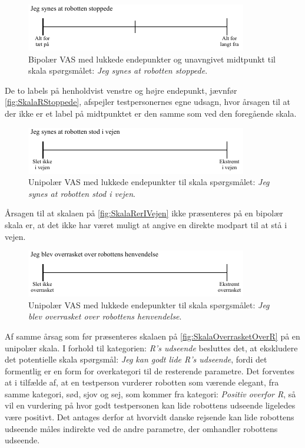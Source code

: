 %
\begin{figure}[H]
\centering
\includegraphics[width =\textwidth]{Figure/UdvalgteSkalaer/RStoppede} 
\caption{Bipolær VAS med lukkede endepunkter og unavngivet midtpunkt til skala spørgsmålet: \textit{Jeg synes at robotten stoppede}.}
\label{fig:SkalaRStoppede}
\end{figure}
\noindent
%
De to labels på henholdvist venstre og højre endepunkt, jævnfør \autoref{fig:SkalaRStoppede}, afspejler testpersonernes egne udsagn, hvor årsagen til at der ikke er et label på midtpunktet er den samme som ved den foregående skala. 
%
\begin{figure}[H]
\centering
\includegraphics[width =\textwidth]{Figure/UdvalgteSkalaer/RobottenErIVejen} 
\caption{Unipolær VAS med lukkede endepunkter til skala spørgsmålet: \textit{Jeg synes at robotten stod i vejen}.}
\label{fig:SkalaRerIVejen}
\end{figure}
\noindent
%
Årsagen til at skalaen på \autoref{fig:SkalaRerIVejen} ikke præsenteres på en bipolær skala er, at det ikke har været muligt at angive en direkte modpart til at stå i vejen. 
%
\begin{figure}[H]
\centering
\includegraphics[width =\textwidth]{Figure/UdvalgteSkalaer/OverrasketOverR} 
\caption{Unipolær VAS med lukkede endepunkter til skala spørgsmålet: \textit{Jeg blev overrasket over robottens henvendelse}.}
\label{fig:SkalaOverrasketOverR}
\end{figure}
\noindent
%
Af samme årsag som før præsenteres skalaen på \autoref{fig:SkalaOverrasketOverR} på en unipolær skala. \blankline
%
I forhold til kategorien: \textit{R's udseende} besluttes det, at ekskludere det potentielle skala spørgsmål: \textit{Jeg kan godt lide R's udseende}, fordi det formentlig er en form for overkategori til de resterende parametre. Det forventes at i tilfælde af, at en testperson vurderer robotten som værende elegant, fra samme kategori, sød, sjov og sej, som kommer fra kategori: \textit{Positiv overfor R}, så vil en vurdering på hvor godt testpersonen kan lide robottens udseende ligeledes være positivt. Det antages derfor at hvorvidt danske rejsende kan lide robottens udseende måles indirekte ved de andre parametre, der omhandler robottens udseende.
